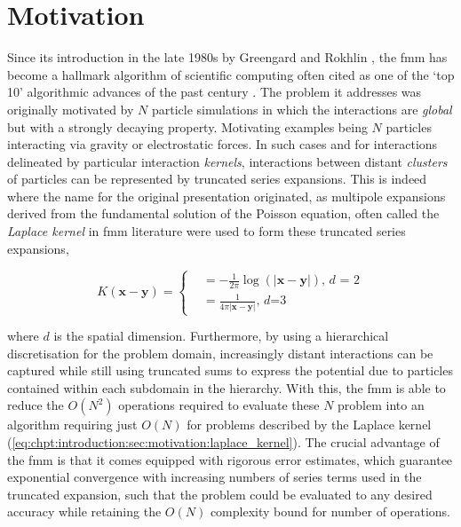 \section{Motivation}\label{chpt:introduction:sec:motivation}




Since its introduction in the late 1980s by Greengard and Rokhlin \cite{greengard1987fast}, the \acrfull{fmm} has become a hallmark algorithm of scientific computing often cited as one of the `top 10' algorithmic advances of the past century \cite{cipra2000best}. The problem it addresses was originally motivated by $N$ particle simulations in which the interactions are \textit{global} but with a strongly decaying property. Motivating examples being $N$ particles interacting via gravity or electrostatic forces. In such cases and for interactions delineated by particular interaction \textit{kernels}, interactions between distant \textit{clusters} of particles can be represented by truncated series expansions. This is indeed where the name for the original presentation originated, as multipole expansions derived from the fundamental solution of the Poisson equation, often called the \textit{Laplace kernel} in \acrshort{fmm} literature were used to form these truncated series expansions,


\begin{equation}
    K(\mathbf{x-y}) =  \begin{cases}
        &= -\frac{1}{2\pi} \log(|\mathbf{x-y}|) \text{, $d$ = 2} \\
        &= \frac{1}{4\pi | \mathbf{x-y}|} \text{, $d$=3 }
    \end{cases}
    \label{eq:chpt:introduction:sec:motivation:laplace_kernel}
\end{equation}


where $d$ is the spatial dimension. Furthermore, by using a hierarchical discretisation for the problem domain, increasingly distant interactions can be captured while still using truncated sums to express the potential due to particles contained within each subdomain in the hierarchy. With this, the \acrshort{fmm} is able to reduce the $O(N^2)$ operations required to evaluate these $N$ problem into an algorithm requiring just $O(N)$ for problems described by the Laplace kernel (\ref{eq:chpt:introduction:sec:motivation:laplace_kernel}). The crucial advantage of the \acrshort{fmm} is that it comes equipped with rigorous error estimates, which guarantee exponential convergence with increasing numbers of series terms used in the truncated expansion, such that the problem could be evaluated to any desired accuracy while retaining the $O(N)$ complexity bound for number of operations.

